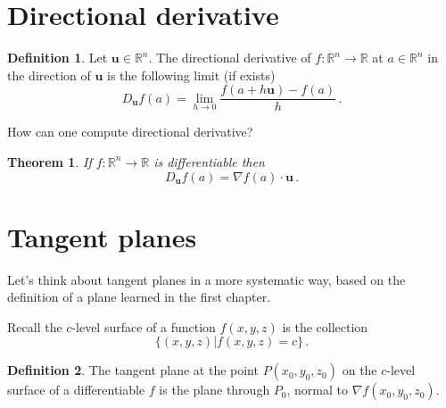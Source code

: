 \documentclass[
]{book}
\newtheorem{theorem}{Theorem}[chapter]
\theoremstyle{definition}
\newtheorem{definition}{Definition}[chapter]
\theoremstyle{definition}
\theoremstyle{definition}
\theoremstyle{definition}
\theoremstyle{remark}
\begin{document}
\section{Directional derivative}\label{directional-derivative}

\begin{definition}
Let \(\mathbf{u} \in \mathbb{R}^n\). The directional derivative of \(f:\mathbb{R}^n \to \mathbb{R}\) at \(a\in \mathbb{R}^n\)
in the direction of \(\mathbf{u}\) is the following limit (if exists)
\begin{equation*}
    D_{\mathbf{u}} f(a) = \lim_{h \to 0} \frac{ f( a + h \mathbf{u}) - f(a)}{h}\,.
\end{equation*}
\end{definition}

How can one compute directional derivative?

\begin{theorem}
If \(f:\mathbb{R}^n \to \mathbb{R}\) is differentiable then
\begin{equation*}
    D_{\mathbf{u}} f(a) = \nabla f(a) \cdot \mathbf{u} \,.
\end{equation*}
\end{theorem}

\section{Tangent planes}\label{tangent-planes}

Let's think about tangent planes in a more systematic way, based on the definition
of a plane learned in the first chapter.

Recall the \(c\)-level surface of a function \(f(x,y,z)\) is the collection
\begin{equation*}
    \{ (x,y,z) | f(x,y,z) = c \} \,.
\end{equation*}

\begin{definition}
The tangent plane at the point \(P(x_0, y_0, z_0)\) on the \(c\)-level surface of a differentiable \(f\)
is the plane through \(P_0\), normal to \(\nabla f (x_0, y_0, z_0)\).
\end{definition}
\end{document}
